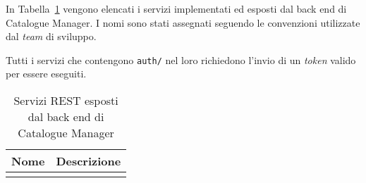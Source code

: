 In Tabella~\ref{tab:serviziREST} vengono elencati i servizi  implementati ed esposti dal back end di Catalogue Manager. I nomi sono stati assegnati seguendo le convenzioni utilizzate dal \textit{team} di sviluppo.

Tutti i servizi che contengono \texttt{auth/} nel loro  richiedono l'invio di un \textit{token} valido per essere eseguiti.
\begin{center}
  \bgroup
  
  \begin{longtable}{ | m{6.5cm} | p{6.5cm} |}
    \hline
    \cellcolor[gray]{0.9} \textbf{Nome} & \cellcolor[gray]{0.9} \textbf{Descrizione} \\ \hline
    
    \caption[Servizi REST esposti dal back end di Catalogue Manager]{Servizi REST esposti dal back end di Catalogue Manager}
    \label{tab:serviziREST} 
    \end{longtable}
  \egroup
\end{center} 